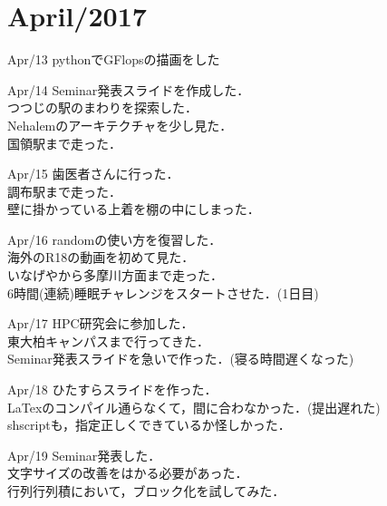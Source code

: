 \documentclass[11pt, a4paper]{jsarticle}
\begin{document}
\tableofcontents %
\newpage

\section{April/2017}
\begin{itembox}[r]{Apr/13}
	pythonでGFlopsの描画をした
\end{itembox}

\begin{itembox}[r]{Apr/14}
	Seminar発表スライドを作成した．\\
	つつじの駅のまわりを探索した．\\
	Nehalemのアーキテクチャを少し見た．\\
	国領駅まで走った．
\end{itembox}

\begin{itembox}[r]{Apr/15}
	歯医者さんに行った．\\
	調布駅まで走った．\\
	壁に掛かっている上着を棚の中にしまった．
\end{itembox}

\begin{itembox}[r]{Apr/16}
	randomの使い方を復習した．\\
	海外のR18の動画を初めて見た．\\
	いなげやから多摩川方面まで走った．\\
	6時間(連続)睡眠チャレンジをスタートさせた．(1日目)
\end{itembox}

\begin{itembox}[r]{Apr/17}
	HPC研究会に参加した．\\
	東大柏キャンパスまで行ってきた．\\
	Seminar発表スライドを急いで作った．(寝る時間遅くなった)
\end{itembox}

\begin{itembox}[r]{Apr/18}
	ひたすらスライドを作った．\\
	LaTexのコンパイル通らなくて，間に合わなかった．(提出遅れた)\\
	shscriptも，指定正しくできているか怪しかった．
\end{itembox}

\begin{itembox}[r]{Apr/19}
	Seminar発表した．\\
	文字サイズの改善をはかる必要があった．\\
	行列行列積において，ブロック化を試してみた．
\end{itembox}
\end{document}

